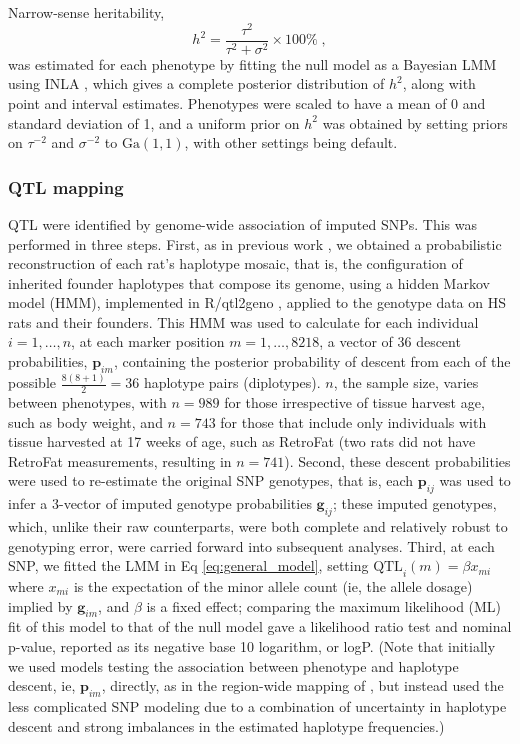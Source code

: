 Narrow-sense heritability,
\[	
h^{2} = \frac{\tau^{2}}{\tau^{2} + \sigma^{2}} \times 100\%\;,
\]
was estimated for each phenotype by fitting the null model as a Bayesian LMM using INLA \citep{Rue2009a,Holand2013a}, which gives a complete posterior distribution of $h^{2}$, along with point and interval estimates. Phenotypes were scaled to have a mean of 0 and standard deviation of 1, and a uniform prior on $h^{2}$ was obtained by setting priors on $\tau^{-2}$ and $\sigma^{-2}$ to $\text{Ga}(1, 1)$, with other settings being default.

\subsubsection{QTL mapping}

QTL were identified by genome-wide association of imputed SNPs. This was performed in three steps. First, as in previous work \citep{SolbergWoods2012}, we obtained a probabilistic reconstruction of each rat's haplotype mosaic, that is, the configuration of inherited founder haplotypes that compose its genome, using a hidden Markov model (HMM), implemented in R/qtl2geno \citep{Broman2016}, applied to the genotype data on HS rats and their founders. This HMM was used to calculate for each individual $i = 1, \ldots, n$, at each marker position $m = 1, \ldots, 8218$, a vector of 36 descent probabilities, $\mathbf{p}_{im}$, containing the posterior probability of descent from each of the possible $\frac{8(8+1)}{2} = 36$ haplotype pairs (diplotypes). $n$, the sample size, varies between phenotypes, with $n = 989$ for those irrespective of tissue harvest age, such as body weight, and $n = 743$ for those that include only individuals with tissue harvested at 17 weeks of age, such as RetroFat (two rats did not have RetroFat measurements, resulting in $n = 741$). Second, these descent probabilities were used to re-estimate the original SNP genotypes, that is, each $\mathbf{p}_{ij}$ was used to infer a 3-vector of imputed genotype probabilities $\mathbf{g}_{ij}$; these imputed genotypes, which, unlike their raw counterparts, were both complete and relatively robust to genotyping error, were carried forward into subsequent analyses. Third, at each SNP, we fitted the LMM in Eq \ref{eq:general_model}, setting $\text{QTL}_{i}(m) = \beta x_{mi}$ where $x_{mi}$ is the expectation of the minor allele count (ie, the allele dosage) implied by $\mathbf{g}_{im}$, and $\beta$ is a fixed effect; comparing the maximum likelihood (ML) fit of this model to that of the null model gave a likelihood ratio test and nominal p-value, reported as its negative base 10 logarithm, or logP. (Note that initially we used models testing the association between phenotype and haplotype descent, ie, $\mathbf{p}_{im}$, directly, as in the region-wide mapping of \cite{SolbergWoods2012}, but instead used the less complicated SNP modeling due to a combination of uncertainty in haplotype descent and strong imbalances in the estimated haplotype frequencies.) 

